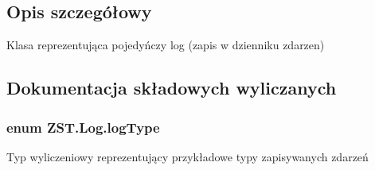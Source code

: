\subsection{Opis szczegółowy}
Klasa reprezentująca pojedyńczy log (zapis w dzienniku zdarzen) 



\subsection{Dokumentacja składowych wyliczanych}
\hypertarget{class_z_s_t_1_1_log_aefc9edf31eecb73ccb4c0ef6077b85fe}{}
\subsubsection[{log\+Type}]{\setlength{\rightskip}{0pt plus 5cm}enum {\bf Z\+S\+T.\+Log.\+log\+Type}}\label{class_z_s_t_1_1_log_aefc9edf31eecb73ccb4c0ef6077b85fe}


Typ wyliczeniowy reprezentujący przykładowe typy zapisywanych zdarzeń 

